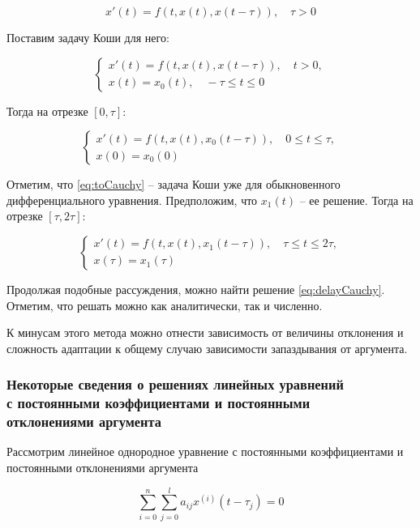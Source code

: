 \begin{equation}
x'(t) = f(t,x(t),x(t-\tau)), \quad \tau>0
\end{equation}

Поставим задачу Коши для него:

\begin{equation}\label{eq:delayCauchy}
\left\{
\begin{aligned}
x'(t) = f(t,x(t),x(t-\tau)), \quad t>0,\\
x(t) = x_0(t), \quad -\tau \leq t \leq 0
\end{aligned}
\right.
\end{equation}

Тогда на отрезке $[0,\tau]$:

\begin{equation}\label{eq:toCauchy}
\left\{
\begin{aligned}
x'(t) = f(t,x(t),x_0(t-\tau)), \quad 0 \leq t \leq \tau,\\
x(0) = x_0(0)
\end{aligned}
\right.
\end{equation}

Отметим, что \ref{eq:toCauchy} \--- задача Коши уже для обыкновенного дифференциального уравнения. Предположим, что $x_1(t)$ \--- ее решение. Тогда на отрезке $[\tau,2\tau]$:

\begin{equation}\label{eq:toCauchy}
\left\{
\begin{aligned}
x'(t) = f(t,x(t),x_1(t-\tau)), \quad \tau \leq t \leq 2\tau,\\
x(\tau) = x_1(\tau)
\end{aligned}
\right.
\end{equation}

Продолжая подобные рассуждения, можно найти решение \ref{eq:delayCauchy}. Отметим, что решать можно как аналитически, так и численно.

К минусам этого метода можно отнести зависимость от величины отклонения и сложность адаптации к общему случаю зависимости запаздывания от аргумента.

\subsubsection{Некоторые сведения о решениях линейных уравнений\\с постоянными коэффициентами и постоянными\\отклонениями аргумента}

Рассмотрим линейное однородное уравнение с постоянными коэффициентами и постоянными отклонениями аргумента

\begin{equation}
\sum\limits_{i=0}^{n} \sum\limits_{j=0}^{l} a_{ij} x^{(i)}(t-\tau_j) = 0
\end{equation}